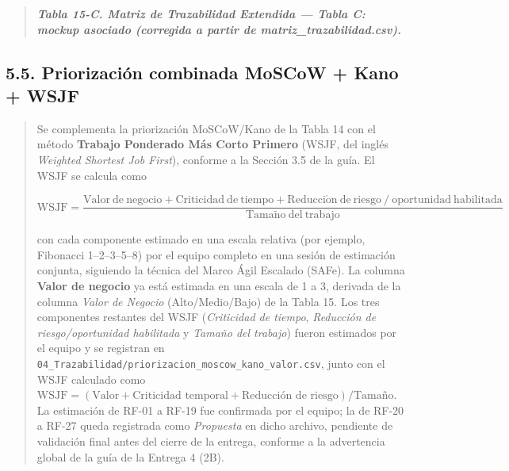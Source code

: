 \documentclass[
]{article}
\begin{document}
\begin{quote}
\protect{}\label{table15c}{}\emph{\textbf{Tabla 15-C. Matriz de
Trazabilidad Extendida --- Tabla C: mockup asociado (corregida a partir de matriz\_trazabilidad.csv).}}
\end{quote}

\subsection{5.5. Priorización combinada MoSCoW + Kano + WSJF}\label{priorizacion-wsjf}

\begin{quote}
Se complementa la priorización MoSCoW/Kano de la Tabla 14 con el método
\textbf{Trabajo Ponderado Más Corto Primero} (WSJF, del inglés \emph{Weighted
Shortest Job First}), conforme a la Sección 3.5 de la guía. El WSJF se
calcula como
\begin{small}
\[
\mathrm{WSJF} = \frac{\mathrm{Valor\ de\ negocio} + \mathrm{Criticidad\ de\ tiempo} +
\mathrm{Reducci\acute{o}n\ de\ riesgo\ /\ oportunidad\ habilitada}}{\mathrm{Tama\tilde{n}o\ del\ trabajo}}
\]
\end{small}
con cada componente estimado en una escala relativa (por ejemplo, Fibonacci
1--2--3--5--8) por el equipo completo en una sesión de estimación conjunta,
siguiendo la técnica del Marco Ágil Escalado (SAFe). La columna \textbf{Valor
de negocio} ya está estimada en una escala de 1 a 3, derivada de la columna
\emph{Valor de Negocio} (Alto/Medio/Bajo) de la Tabla 15. Los tres
componentes restantes del WSJF (\emph{Criticidad de tiempo}, \emph{Reducción
de riesgo/oportunidad habilitada} y \emph{Tamaño del trabajo}) fueron
estimados por el equipo y se registran en
\texttt{04\_Trazabilidad/priorizacion\_moscow\_kano\_valor.csv},
junto con el WSJF calculado como
$\mathrm{WSJF} = (\text{Valor} + \text{Criticidad temporal} + \text{Reducción de riesgo}) / \text{Tamaño}$.
La estimación de RF-01 a RF-19 fue confirmada por el equipo; la de RF-20 a
RF-27 queda registrada como \emph{Propuesta} en dicho archivo, pendiente de
validación final antes del cierre de la entrega, conforme a la advertencia
global de la guía de la Entrega 4 (2B).
\end{quote}
\end{document}
